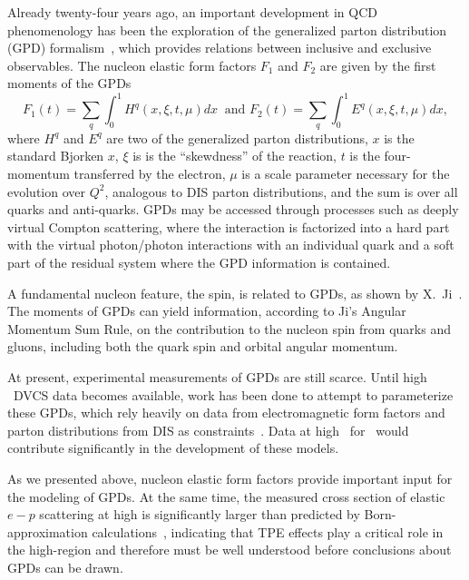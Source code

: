Already twenty-four years ago, an important development in QCD phenomenology has been the exploration of the generalized parton distribution (GPD) formalism~\cite{Mueller:1998fv, Ji:1996ek, Radyushkin:1996nd}, which provides relations between inclusive and exclusive observables.
The nucleon elastic form factors $F_1$ and $F_2$ are given by the first moments of the GPDs
%
\begin{equation}
F_1(t) = \sum_q \int^1_0 H^q (x,\xi,t,\mu) dx\ 
 \mbox{  and\  }
F_2(t) = \sum_q \int^1_0 E^q (x,\xi,t,\mu) dx,
\label{eq:F1/2}
\end{equation}
%
where $H^q$ and $E^q$ are two of the generalized parton distributions, $x$ is the standard Bjorken $x$, $\xi$ is is the ``skewdness'' of the reaction, $t$ is the four-momentum transferred by the electron, $\mu$ is a scale parameter necessary for the evolution over $Q^2$, analogous to DIS parton distributions, and the sum is over all quarks and anti-quarks.  
GPDs may be accessed through processes such as deeply virtual Compton scattering, where the interaction is factorized into a hard part with the virtual photon/photon interactions with an individual quark and a soft part of the residual system where the GPD information is contained.

A fundamental nucleon feature, the spin, is related to GPDs, as shown by X.~Ji~\cite{Ji:1996ek}. 
The moments of GPDs can yield information, according to Ji's Angular Momentum Sum Rule, 
on the contribution to the nucleon spin from quarks and gluons, including both the quark spin and orbital angular momentum.

At present, experimental measurements of GPDs are still scarce.  
Until high \qsq~DVCS data becomes available, work has been done to attempt to parameterize these GPDs,  
which rely heavily on data from electromagnetic form factors and parton distributions from DIS as constraints~\cite{Diehl:2013xca}.  
Data at high \qsq~for \gen~would contribute significantly in the development of these models.

%
As we presented above, nucleon elastic form factors provide important input for the modeling of GPDs.
At the same time, the measured cross section of elastic $e-p$ scattering at high \qsq
 is significantly larger than predicted by Born-approximation calculations~\cite{Kivel2020ab}, indicating that TPE effects play
a critical role in the high-\qsq region and therefore must be well understood
before conclusions about GPDs can be drawn.
